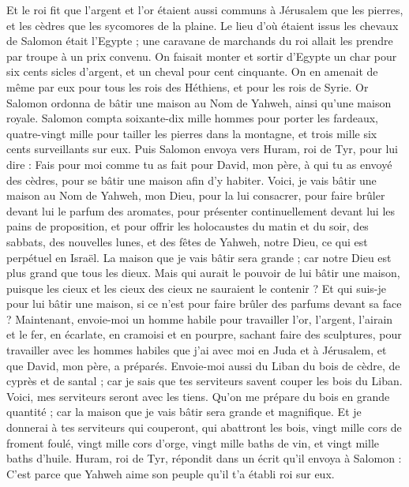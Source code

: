 \begin{multicols}{2}
Et le roi fit que l'argent et l'or étaient aussi communs à Jérusalem que les pierres, et les cèdres que les sycomores de la plaine.
Le lieu d'où étaient issus les chevaux de Salomon était l'Egypte ; une caravane de marchands du roi allait les prendre par troupe à un prix convenu.
On faisait monter et sortir d'Egypte un char pour six cents sicles d'argent, et un cheval pour cent cinquante. On en amenait de même par eux pour tous les rois des Héthiens, et pour les rois de Syrie.
\VerseOne{}Or Salomon ordonna de bâtir une maison au Nom de Yahweh, ainsi qu'une maison royale.
Salomon compta soixante-dix mille hommes pour porter les fardeaux, quatre-vingt mille pour tailler les pierres dans la montagne, et trois mille six cents surveillants sur eux.
Puis Salomon envoya vers Huram, roi de Tyr, pour lui dire : Fais pour moi comme tu as fait pour David, mon père, à qui tu as envoyé des cèdres, pour se bâtir une maison afin d'y habiter.
Voici, je vais bâtir une maison au Nom de Yahweh, mon Dieu, pour la lui consacrer, pour faire brûler devant lui le parfum des aromates, pour présenter continuellement devant lui les pains de proposition, et pour offrir les holocaustes du matin et du soir, des sabbats, des nouvelles lunes, et des fêtes de Yahweh, notre Dieu, ce qui est perpétuel en Israël.
La maison que je vais bâtir sera grande ; car notre Dieu est plus grand que tous les dieux.
Mais qui aurait le pouvoir de lui bâtir une maison, puisque les cieux et les cieux des cieux ne sauraient le contenir ? Et qui suis-je pour lui bâtir une maison, si ce n'est pour faire brûler des parfums devant sa face ?
Maintenant, envoie-moi un homme habile pour travailler l'or, l'argent, l'airain et le fer, en écarlate, en cramoisi et en pourpre, sachant faire des sculptures, pour travailler avec les hommes habiles que j'ai avec moi en Juda et à Jérusalem, et que David, mon père, a préparés.
Envoie-moi aussi du Liban du bois de cèdre, de cyprès et de santal ; car je sais que tes serviteurs savent couper les bois du Liban. Voici, mes serviteurs seront avec les tiens.
Qu'on me prépare du bois en grande quantité ; car la maison que je vais bâtir sera grande et magnifique.
Et je donnerai à tes serviteurs qui couperont, qui abattront les bois, vingt mille cors de froment foulé, vingt mille cors d'orge, vingt mille baths de vin, et vingt mille baths d'huile.
Huram, roi de Tyr, répondit dans un écrit qu'il envoya à Salomon : C'est parce que Yahweh aime son peuple qu'il t'a établi roi sur eux.

\end{multicols}
